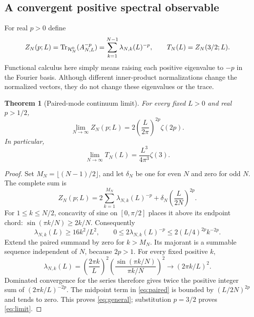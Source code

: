 \documentclass[11pt,a4paper]{article}
\newtheorem{theorem}{Theorem}[section]
\theoremstyle{definition}\newtheorem{definition}[theorem]{Definition}
\theoremstyle{remark}\newtheorem{remark}[theorem]{Remark}
\newcommand{\Tr}{\operatorname{Tr}}
\numberwithin{equation}{section}
\begin{document}
\subsection{A convergent positive spectral observable}
For real \(p>0\) define
\begin{equation}
 Z_N(p;L)=\Tr_{\mathcal H_N^0}(\AN^{-p})
  =\sum_{k=1}^{N-1}\lambda_{N,k}(L)^{-p},
 \qquad T_N(L)=Z_N(3/2;L).
 \label{eq:trace}
\end{equation}
Functional calculus here simply means raising each positive eigenvalue
to \(-p\) in the Fourier basis. Although different inner-product
normalizations change the normalized vectors, they do not change these
eigenvalues or the trace.

\begin{theorem}[Paired-mode continuum limit]\label{thm:limit}
For every fixed \(L>0\) and real \(p>1/2\),
\begin{equation}
 \lim_{N\to\infty}Z_N(p;L)
  =2\left(\frac{L}{2\pi}\right)^{2p}\zeta(2p).
 \label{eq:general}
\end{equation}
In particular,
\begin{equation}
 \boxed{\displaystyle \lim_{N\to\infty}T_N(L)
             =\frac{L^3}{4\pi^3}\zeta(3).}
 \label{eq:limit}
\end{equation}
\end{theorem}
\begin{proof}
Set \(M_N=\lfloor(N-1)/2\rfloor\), and let \(\delta_N\) be one for even
\(N\) and zero for odd \(N\). The complete sum is
\begin{equation}
 Z_N(p;L)=2\sum_{k=1}^{M_N}\lambda_{N,k}(L)^{-p}
          +\delta_N\left(\frac{L}{2N}\right)^{2p}.
 \label{eq:paired}
\end{equation}
For \(1\leq k\leq N/2\), concavity of sine on \([0,\pi/2]\) places it
above its endpoint chord:
\(\sin(\pi k/N)\geq2k/N\). Consequently
\[
 \lambda_{N,k}(L)\geq16k^2/L^2,\qquad
 0\leq2\lambda_{N,k}(L)^{-p}
       \leq2(L/4)^{2p}k^{-2p}.
\]
Extend the paired summand by zero for \(k>M_N\). Its majorant is a
summable sequence independent of \(N\), because \(2p>1\).
For every fixed positive \(k\),
\[
 \lambda_{N,k}(L)
 =\left(\frac{2\pi k}{L}\right)^2
   \left(\frac{\sin(\pi k/N)}{\pi k/N}\right)^2
 \longrightarrow (2\pi k/L)^2.
\]
Dominated convergence for the series therefore gives twice the positive
integer sum of \((2\pi k/L)^{-2p}\).
The midpoint term in \eqref{eq:paired} is bounded by
\((L/2N)^{2p}\) and tends to zero. This proves \eqref{eq:general};
substitution \(p=3/2\) proves \eqref{eq:limit}.
\end{proof}
\end{document}
